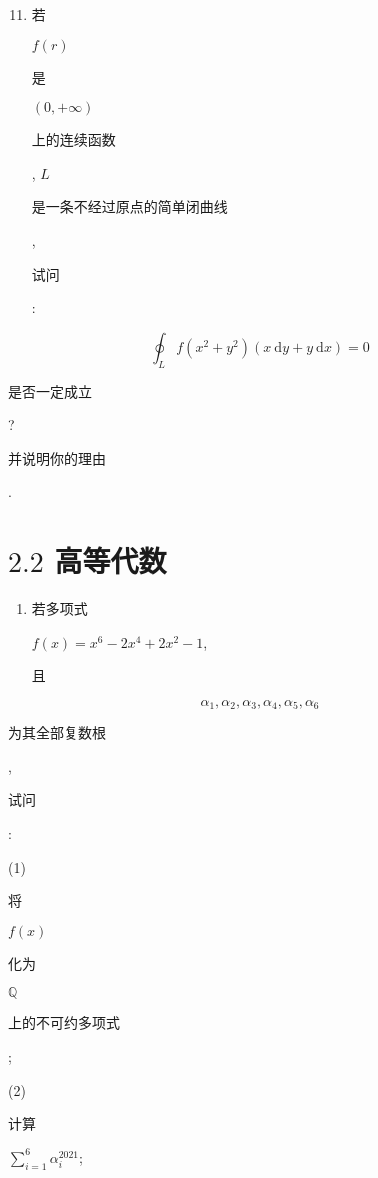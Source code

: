 \documentclass[10pt]{article}
\begin{document}
\begin{enumerate}
  \setcounter{enumi}{10}
  \item \begin{CJK}{UTF8}{mj}若\end{CJK} $f(r)$ \begin{CJK}{UTF8}{mj}是\end{CJK} $(0,+\infty)$ \begin{CJK}{UTF8}{mj}上的连续函数\end{CJK}, $L$ \begin{CJK}{UTF8}{mj}是一条不经过原点的简单闭曲线\end{CJK}, \begin{CJK}{UTF8}{mj}试问\end{CJK}:
\end{enumerate}
$$
\oint_{L} f\left(x^{2}+y^{2}\right)(x \mathrm{~d} y+y \mathrm{~d} x)=0
$$
\begin{CJK}{UTF8}{mj}是否一定成立\end{CJK}? \begin{CJK}{UTF8}{mj}并说明你的理由\end{CJK}.

\section{$2.2$ 高等代数}
\begin{enumerate}
  \item \begin{CJK}{UTF8}{mj}若多项式\end{CJK} $f(x)=x^{6}-2 x^{4}+2 x^{2}-1$, \begin{CJK}{UTF8}{mj}且\end{CJK}
\end{enumerate}
$$
\alpha_{1}, \alpha_{2}, \alpha_{3}, \alpha_{4}, \alpha_{5}, \alpha_{6}
$$
\begin{CJK}{UTF8}{mj}为其全部复数根\end{CJK}, \begin{CJK}{UTF8}{mj}试问\end{CJK}:

(1) \begin{CJK}{UTF8}{mj}将\end{CJK} $f(x)$ \begin{CJK}{UTF8}{mj}化为\end{CJK} $\mathbb{Q}$ \begin{CJK}{UTF8}{mj}上的不可约多项式\end{CJK};

(2) \begin{CJK}{UTF8}{mj}计算\end{CJK} $\sum_{i=1}^{6} \alpha_{i}^{2021}$;
\end{document}
